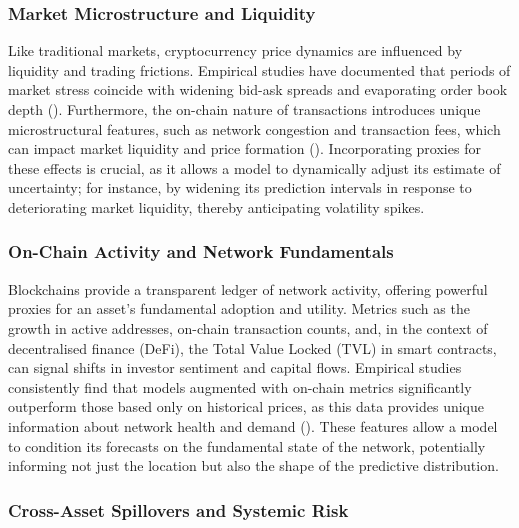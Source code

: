 \documentclass[
  a4paper,
  DIV=11,
  numbers=noendperiod]{scrreprt}
\begin{document}
\subsubsection{Market Microstructure and
Liquidity}\label{market-microstructure-and-liquidity}

Like traditional markets, cryptocurrency price dynamics are influenced
by liquidity and trading frictions. Empirical studies have documented
that periods of market stress coincide with widening bid-ask spreads and
evaporating order book depth (). Furthermore, the on-chain nature of transactions introduces
unique microstructural features, such as network congestion and
transaction fees, which can impact market liquidity and price formation
().
Incorporating proxies for these effects is crucial, as it allows a model
to dynamically adjust its estimate of uncertainty; for instance, by
widening its prediction intervals in response to deteriorating market
liquidity, thereby anticipating volatility spikes.

\subsubsection{On-Chain Activity and Network
Fundamentals}\label{on-chain-activity-and-network-fundamentals}

Blockchains provide a transparent ledger of network activity, offering
powerful proxies for an asset's fundamental adoption and utility.
Metrics such as the growth in active addresses, on-chain transaction
counts, and, in the context of decentralised finance (DeFi), the Total
Value Locked (TVL) in smart contracts, can signal shifts in investor
sentiment and capital flows. Empirical studies consistently find that
models augmented with on-chain metrics significantly outperform those
based only on historical prices, as this data provides unique
information about network health and demand
(). These
features allow a model to condition its forecasts on the fundamental
state of the network, potentially informing not just the location but
also the shape of the predictive distribution.

\subsubsection{Cross-Asset Spillovers and Systemic
Risk}\label{cross-asset-spillovers-and-systemic-risk}
\end{document}
